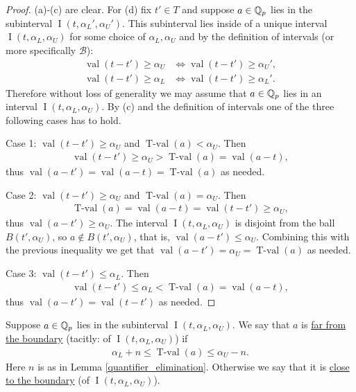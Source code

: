 \documentclass{amsart}
\newcommand{\BB}{\mathscr B}
\DeclareMathOperator{\val}{val}
\DeclareMathOperator{\vval}{val}
\DeclareMathOperator{\tval}{T-val}
\DeclareMathOperator{\inti}{I}
\newcommand{\defn}{\ul}
\newcommand{\interval}{\inti(t, \alpha_L, \alpha_U)}
\begin{document}
\begin{proof}
  (a)-(c) are clear.
  For (d) fix $t' \in T$ and suppose $a \in \mathbb{Q}_p$ lies in the subinterval $\inti(t, \alpha_L', \alpha_U')$.
  This  subinterval lies inside of a unique interval $\interval$ for some choice of $\alpha_L, \alpha_U$ and
  by the definition of intervals (or more specifically $\BB$):
  \begin{align*}
    \vval(t - t') \geq \alpha_U &\iff \vval(t - t') \geq \alpha_U',\\
    \vval(t - t') \geq \alpha_L &\iff \vval(t - t') \geq \alpha_L'.
  \end{align*}
  Therefore without loss of generality we may assume that $a \in \mathbb{Q}_p$ lies in an interval $\interval$.
  By (c) and the definition of intervals one of the three following cases has to hold.
  
  Case 1: $\vval(t - t') \geq \alpha_U$ and $\tval(a) < \alpha_U$. Then
  \begin{align*}
    \vval(t - t') \geq \alpha_U > \tval(a) = \vval(a - t),
  \end{align*}
  thus $\vval(a - t') = \vval(a - t) = \tval(a)$ as needed.

  Case 2: $\vval(t - t') \geq \alpha_U$ and $\tval(a) = \alpha_U$. Then
  \begin{align*}
    \tval(a) = \vval(a - t) = \vval(t - t') \geq \alpha_U,
  \end{align*}
  thus $\vval(a - t') \geq \alpha_U$.
  The interval $\interval$ is disjoint from the ball $B(t', \alpha_U)$,
  so $a \notin B(t', \alpha_U)$, that is, $\val(a - t') \leq \alpha_U$.
  Combining this with the previous inequality we get that $\val(a - t') = \alpha_U = \tval(a)$ as needed.

  Case 3: $\vval(t - t') \leq \alpha_L$. Then
  \begin{align*}
    \vval(t - t') \leq \alpha_L < \tval(a) = \vval(a - t),
  \end{align*}
  thus $\vval(a - t') = \vval(t - t')$ as needed. 
\end{proof}




\begin{Definition}
  Suppose $a \in \mathbb{Q}_p$ lies in the subinterval $\interval$.
  We say that $a$ is \defn{far from the boundary} (tacitly: of $\interval$) if 
    \begin{align*}
	\alpha_L + n \leq \tval(a) \leq \alpha_U - n.
    \end{align*}
  Here $n$ is as in Lemma \ref{quantifier_elimination}.
  Otherwise we say that it is \defn{close to the boundary} (of $\interval$).
\end{Definition}
\end{document}
